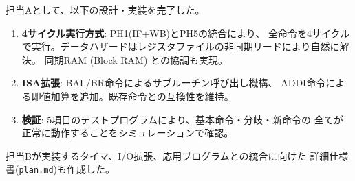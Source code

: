 \documentclass[a4paper,11pt]{ltjsarticle}
\begin{document}
担当Aとして、以下の設計・実装を完了した。

\begin{enumerate}
\item \textbf{4サイクル実行方式}: PH1(IF+WB)とPH5の統合により、
  全命令を4サイクルで実行。データハザードはレジスタファイルの非同期リードにより自然に解決。
  同期RAM (Block RAM) との協調も実現。

\item \textbf{ISA拡張}: BAL/BR命令によるサブルーチン呼び出し機構、
  ADDI命令による即値加算を追加。既存命令との互換性を維持。

\item \textbf{検証}: 5項目のテストプログラムにより、基本命令・分岐・新命令の
  全てが正常に動作することをシミュレーションで確認。
\end{enumerate}

担当Bが実装するタイマ、I/O拡張、応用プログラムとの統合に向けた
詳細仕様書(\texttt{plan.md})も作成した。
\end{document}
